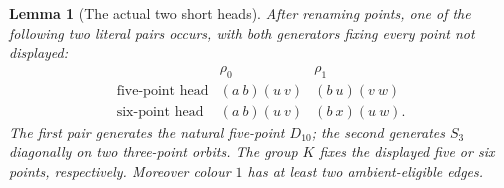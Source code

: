 \documentclass[11pt,a4paper]{article}
\newtheorem{lemma}{Lemma}
\begin{document}
\begin{lemma}[The actual two short heads]
After renaming points, one of the following two literal pairs occurs,
with both generators fixing every point not displayed:
\[
\begin{array}{c|cc}
 &\rho_0&\rho_1\\ \hline
\text{five-point head}&(a\ b)(u\ v)&(b\ u)(v\ w)\\
\text{six-point head}&(a\ b)(u\ v)&(b\ x)(u\ w).
\end{array}                                             \tag{1}
\]
The first pair generates the natural five-point $D_{10}$; the second
generates $S_3$ diagonally on two three-point orbits.
The group $K$ fixes the displayed five or six points, respectively.
Moreover colour $1$ has at least two ambient-eligible edges.
\end{lemma}
\end{document}
